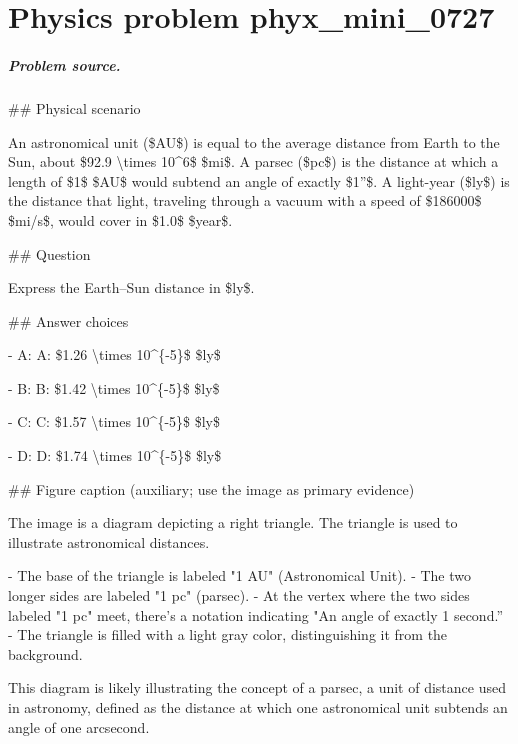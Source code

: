 
\chapter{Physics problem phyx\_mini\_0727}
\label{ch:PhyXMiniProblems_problem_phyx_mini_0727}

\paragraph{Problem source.}
\#\# Physical scenario

An astronomical unit (\$AU\$) is equal to the average distance from Earth to the Sun, about \$92.9 \textbackslash{}times 10\textasciicircum{}6\$ \$mi\$. A parsec (\$pc\$) is the distance at which a length of \$1\$ \$AU\$ would subtend an angle of exactly \$1''\$. A light-year (\$ly\$) is the distance that light, traveling through a vacuum with a speed of \$186000\$ \$mi/s\$, would cover in \$1.0\$ \$year\$.

\#\# Question

Express the Earth--Sun distance in \$ly\$.

\#\# Answer choices

- A: A: \$1.26 \textbackslash{}times 10\textasciicircum{}\{-5\}\$ \$ly\$

- B: B: \$1.42 \textbackslash{}times 10\textasciicircum{}\{-5\}\$ \$ly\$

- C: C: \$1.57 \textbackslash{}times 10\textasciicircum{}\{-5\}\$ \$ly\$

- D: D: \$1.74 \textbackslash{}times 10\textasciicircum{}\{-5\}\$ \$ly\$

\#\# Figure caption (auxiliary; use the image as primary evidence)

The image is a diagram depicting a right triangle. The triangle is used to illustrate astronomical distances. 

- The base of the triangle is labeled "1 AU" (Astronomical Unit).
- The two longer sides are labeled "1 pc" (parsec).
- At the vertex where the two sides labeled "1 pc" meet, there's a notation indicating "An angle of exactly 1 second.”
- The triangle is filled with a light gray color, distinguishing it from the background.

This diagram is likely illustrating the concept of a parsec, a unit of distance used in astronomy, defined as the distance at which one astronomical unit subtends an angle of one arcsecond.

